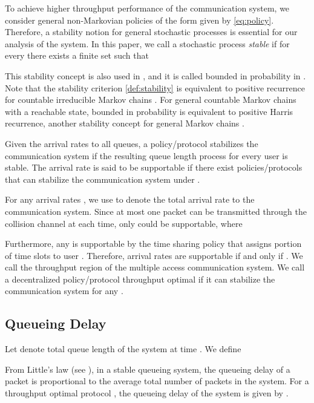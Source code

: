 \documentclass[onecolumn,draftcls]{IEEEtran}
\begin{document}
To achieve higher throughput performance of the communication system, we consider general 
non-Markovian policies of the form given by \eqref{eq:policy}. Therefore, a stability notion for general stochastic processes is essential for our analysis of the system. 
In this paper, we call a stochastic process  \textit{stable} if
for every  there exists a finite set  such that

This stability concept is also used in \cite{szpankowski1994stability,luo1999stability, borst2008stability}, and it is called bounded in probability in \cite{meyn2009markov}.
Note that the stability criterion \eqref{def:stability} is equivalent to positive recurrence for countable irreducible Markov chains \cite[Proposition 18.3.1]{meyn2009markov}. 
For general countable Markov chains with a reachable state, bounded in probability is equivalent to positive Harris recurrence, another stability concept for general Markov chains \cite[Proposition 18.3.2 ]{meyn2009markov}.





Given the arrival rates  to all queues, 
a policy/protocol  stabilizes the communication system if the resulting queue length process
 for every user  is stable.
The arrival rate  is said to be supportable if there exist policies/protocols that can stabilize the communication system under .

For any arrival rates , we use  to denote the total arrival rate to the communication system.
Since at most one packet can be transmitted through the collision channel at each time, only  could be supportable, where


Furthermore, any  is supportable by the time sharing policy that assigns  portion of time slots to user . 
Therefore, arrival rates  are supportable if and only if . We call  the throughput region of the multiple access communication system.
We call a decentralized policy/protocol throughput optimal if it can stabilize the communication system for any . 



\subsection{Queueing Delay} \label{sub:model:delay}
Let  denote total queue length of the system at time .
We define

From Little's law (see \cite{bertsekas1992data}), 
in a stable queueing system, the queueing delay of a packet is proportional to the average total number of packets in the system. 
For a throughput optimal protocol , the queueing delay of the system is given by .
\end{document}
